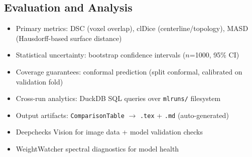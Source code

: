 
\subsection{Evaluation and Analysis}
\begin{itemize}
  \item Primary metrics: DSC (voxel overlap), clDice (centerline/topology), MASD (Hausdorff-based surface distance)
  \item Statistical uncertainty: bootstrap confidence intervals ($n$=1000, 95\% CI)
  \item Coverage guarantees: conformal prediction (split conformal, calibrated on validation fold)
  \item Cross-run analytics: DuckDB SQL queries over \texttt{mlruns/} filesystem
  \item Output artifacts: \texttt{ComparisonTable} $\to$ \texttt{.tex} + \texttt{.md} (auto-generated)
  \item Deepchecks Vision for image data + model validation checks
  \item WeightWatcher spectral diagnostics for model health
\end{itemize}
